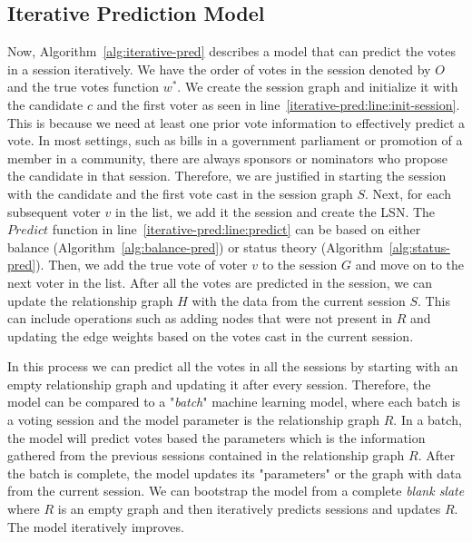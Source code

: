 \subsection{Iterative Prediction Model}

Now, Algorithm~\ref{alg:iterative-pred} describes a model that can predict the votes in a session iteratively. We have the order of votes in the session denoted by $O$ and the true votes function $w^{*}$. We create the session graph and initialize it with the candidate $c$ and the first voter as seen in line~\ref{iterative-pred:line:init-session}. This is because we need at least one prior vote information to effectively predict a vote. In most settings, such as bills in a government parliament or promotion of a member in a community, there are always  sponsors or nominators who propose the candidate in that session. Therefore, we are justified in starting the session with the candidate and the first vote cast in the session graph $S$. Next, for each subsequent voter $v$ in the list, we add it the session and create the LSN. The $Predict$ function in line~\ref{iterative-pred:line:predict} can be based on either balance (Algorithm~\ref{alg:balance-pred}) or status theory (Algorithm~\ref{alg:status-pred}). Then, we add the true vote of voter $v$ to the session $G$ and move on to the next voter in the list. After all the votes are predicted in the session, we can update the relationship graph $H$ with the data from the current session $S$. This can include operations such as adding nodes that were not present in $R$ and updating the edge weights based on the votes cast in the current session.

In this process we can predict all the votes in all the sessions by starting with an empty relationship graph and updating it after every session. Therefore, the model can be compared to a "\textit{batch}" machine learning model, where each batch is a voting session and the model parameter is the relationship graph $R$. In a batch, the model will predict votes based the parameters which is the information gathered from the previous sessions contained in the relationship graph $R$. After the batch is complete, the model updates its "parameters" or the graph with data from the current session. We can bootstrap the model from a complete \textit{blank slate} where $R$ is an empty graph and then iteratively predicts sessions and updates $R$. The model iteratively improves.

